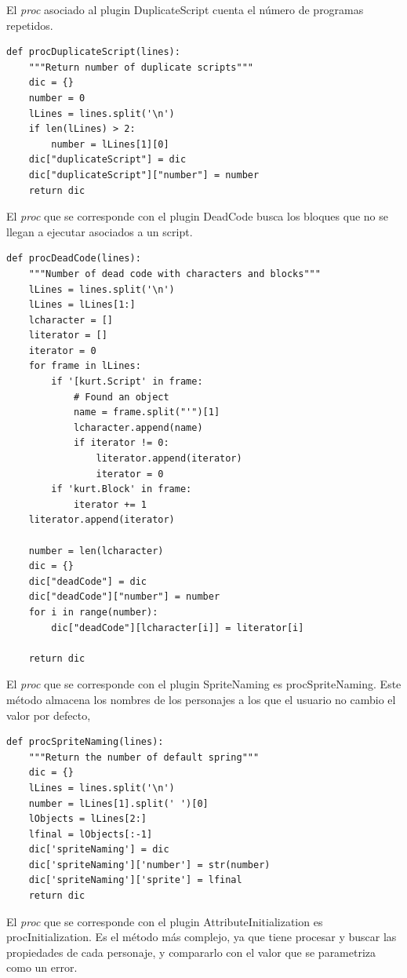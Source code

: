 \documentclass[a4paper, 12pt]{book}
\begin{document}
El \emph{proc} asociado al plugin DuplicateScript cuenta el número de programas
repetidos.
\begingroup
\fontsize{8pt}{9pt}\selectfont
\begin{verbatim}
def procDuplicateScript(lines):
    """Return number of duplicate scripts"""
    dic = {}
    number = 0
    lLines = lines.split('\n')
    if len(lLines) > 2:
        number = lLines[1][0]
    dic["duplicateScript"] = dic
    dic["duplicateScript"]["number"] = number
    return dic
\end{verbatim}
\endgroup

El \emph{proc} que se corresponde con el plugin DeadCode busca los bloques que no se
llegan a ejecutar asociados a un script.
\begingroup
\fontsize{8pt}{9pt}\selectfont
\begin{verbatim}
def procDeadCode(lines):
    """Number of dead code with characters and blocks"""
    lLines = lines.split('\n')
    lLines = lLines[1:]
    lcharacter = []
    literator = []
    iterator = 0
    for frame in lLines:
        if '[kurt.Script' in frame:
            # Found an object
            name = frame.split("'")[1]         
            lcharacter.append(name)
            if iterator != 0:
                literator.append(iterator)
                iterator = 0
        if 'kurt.Block' in frame:
            iterator += 1
    literator.append(iterator)

    number = len(lcharacter)
    dic = {}
    dic["deadCode"] = dic  
    dic["deadCode"]["number"] = number
    for i in range(number):
        dic["deadCode"][lcharacter[i]] = literator[i]
  
    return dic
\end{verbatim}
\endgroup

El \emph{proc} que se corresponde con el plugin SpriteNaming es procSpriteNaming. 
Este método almacena los nombres de los personajes a los que el usuario no 
cambio el valor por defecto,
\begingroup
\fontsize{8pt}{9pt}\selectfont
\begin{verbatim}
def procSpriteNaming(lines):
    """Return the number of default spring"""
    dic = {}
    lLines = lines.split('\n')
    number = lLines[1].split(' ')[0]
    lObjects = lLines[2:]
    lfinal = lObjects[:-1]
    dic['spriteNaming'] = dic
    dic['spriteNaming']['number'] = str(number)
    dic['spriteNaming']['sprite'] = lfinal
    return dic
\end{verbatim}
\endgroup

El \emph{proc} que se corresponde con el plugin AttributeInitialization es 
procInitialization. Es el método más complejo, ya que tiene procesar y 
buscar las propiedades de cada personaje, y compararlo con el valor que 
se parametriza como un error.
\end{document}
